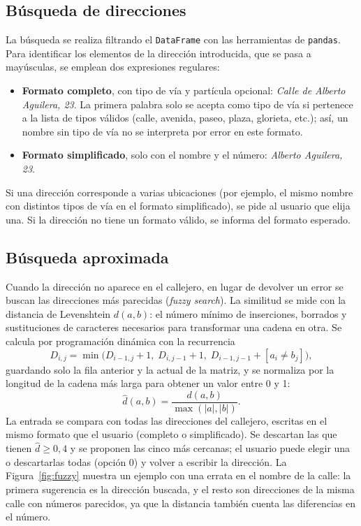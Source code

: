 \documentclass[11pt,a4paper]{article}
\newcommand{\code}[1]{\texttt{#1}}
\begin{document}
\subsection{Búsqueda de direcciones}

La búsqueda se realiza filtrando el \code{DataFrame} con las herramientas de \code{pandas}. Para identificar los elementos de la dirección introducida, que se pasa a mayúsculas, se emplean dos expresiones regulares:

\begin{itemize}
\item \textbf{Formato completo}, con tipo de vía y partícula opcional: \emph{Calle de Alberto Aguilera, 23}. La primera palabra solo se acepta como tipo de vía si pertenece a la lista de tipos válidos (calle, avenida, paseo, plaza, glorieta, etc.); así, un nombre sin tipo de vía no se interpreta por error en este formato.
\item \textbf{Formato simplificado}, solo con el nombre y el número: \emph{Alberto Aguilera, 23}.
\end{itemize}

Si una dirección corresponde a varias ubicaciones (por ejemplo, el mismo nombre con distintos tipos de vía en el formato simplificado), se pide al usuario que elija una. Si la dirección no tiene un formato válido, se informa del formato esperado.

\subsection{Búsqueda aproximada}

Cuando la dirección no aparece en el callejero, en lugar de devolver un error se buscan las direcciones más parecidas (\emph{fuzzy search}). La similitud se mide con la distancia de Levenshtein $d(a,b)$: el número mínimo de inserciones, borrados y sustituciones de caracteres necesarios para transformar una cadena en otra. Se calcula por programación dinámica con la recurrencia
\[
D_{i,j}=\min\bigl(D_{i-1,j}+1,\; D_{i,j-1}+1,\; D_{i-1,j-1}+[a_i\neq b_j]\bigr),
\]
guardando solo la fila anterior y la actual de la matriz, y se normaliza por la longitud de la cadena más larga para obtener un valor entre 0 y 1:
\[
\hat d(a,b)=\frac{d(a,b)}{\max(|a|,|b|)} .
\]
La entrada se compara con todas las direcciones del callejero, escritas en el mismo formato que el usuario (completo o simplificado). Se descartan las que tienen $\hat d\ge0{,}4$ y se proponen las cinco más cercanas; el usuario puede elegir una o descartarlas todas (opción 0) y volver a escribir la dirección. La Figura~\ref{fig:fuzzy} muestra un ejemplo con una errata en el nombre de la calle: la primera sugerencia es la dirección buscada, y el resto son direcciones de la misma calle con números parecidos, ya que la distancia también cuenta las diferencias en el número.
\end{document}

